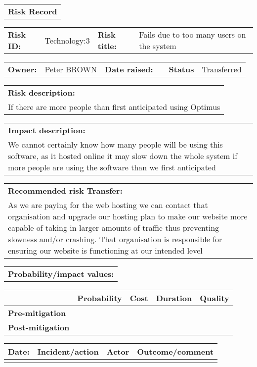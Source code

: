 \begin{table}
	\begin{tabularx}{\textwidth}{| X |}
		\hline
		\textbf{Risk Record} \\
	\end{tabularx}
	\begin{tabularx}{\textwidth}{| l | X | l | X |}
		\hline
		\textbf{Risk ID:} & Technology:3 & \textbf{Risk title:} & Fails due to too many users on the system \\
	\end{tabularx}
	\begin{tabularx}{\textwidth}{| l | X | l | X | l | X |}
		\hline
		\textbf{Owner:} & Peter BROWN & \textbf{Date raised:} &  & \textbf{Status} & Transferred \\
	\end{tabularx}
	\begin{tabularx}{\textwidth}{| X |}
		\hline
		\textbf{Risk description:} \\ If there are more people than first anticipated using Optimus  \\
	\end{tabularx}
	\begin{tabularx}{\textwidth}{| X |}
		\hline
		\textbf{Impact description:} \\ We cannot certainly know how many people will be using this software, as it hosted online it may slow down the whole system if more people are using the software than we first anticipated \\
	\end{tabularx}
	\begin{tabularx}{\textwidth}{| X |}
		\hline
		\textbf{Recommended risk Transfer:} \\ As we are paying for the web hosting we can contact that organisation and upgrade our hosting plan to make our website more capable of taking in larger amounts of traffic thus preventing slowness and/or crashing. That organisation is responsible for ensuring our website is functioning at our intended level \\
	\end{tabularx}
	\begin{tabularx}{\textwidth}{| X |}
		\hline
		\textbf{Probability/impact values:} \\
	\end{tabularx}
	\begin{tabularx}{\textwidth}{| l | l | X | X | X |}
		\hline
		 &  \textbf{Probability} & \textbf{Cost} & \textbf{Duration} & \textbf{Quality} \\ \hline
		\textbf{Pre-mitigation} & & & & \\ \hline
		\textbf{Post-mitigation} & & & & \\ \hline \hline
	\end{tabularx}
	\begin{tabularx}{\textwidth}{| l | X | l | X |}
		\hline
		\textbf{Date:} & \textbf{Incident/action} & \textbf{Actor} & \textbf{Outcome/comment} \\ \hline
		 &  &  &  \\ \hline
	\end{tabularx}
\end{table}

